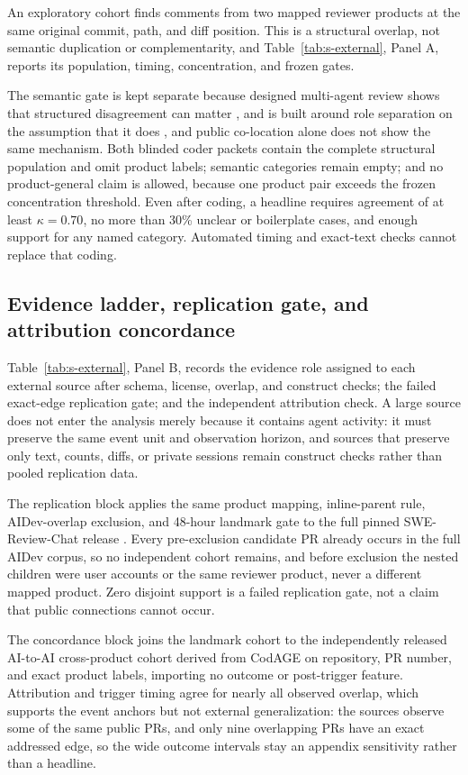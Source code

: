 \documentclass[pdflatex,sn-basic]{sn-jnl}
\begin{document}
An exploratory cohort finds comments from two mapped reviewer products at the
same original commit, path, and diff position. This is a structural overlap, not
semantic duplication or complementarity, and Table~\ref{tab:s-external}, Panel A,
reports its population, timing, concentration, and frozen gates.

The semantic gate is kept separate because designed multi-agent review shows that structured disagreement can matter
\citep{qiu2026adversarial}, and is built around role separation on the
assumption that it does \citep{zhang2026reporeviewer}, and public co-location alone
does not show the same mechanism. Both blinded coder packets contain the
complete structural population and omit product labels; semantic categories
remain empty; and no product-general claim is allowed, because one product pair
exceeds the frozen concentration threshold. Even after coding, a headline
requires agreement of at least $\kappa=0.70$, no more than 30\% unclear or
boilerplate cases, and enough support for any named category. Automated timing
and exact-text checks cannot replace that coding.

\subsection{Evidence ladder, replication gate, and attribution concordance}
\label{app:ladder}

Table~\ref{tab:s-external}, Panel B, records the evidence role assigned to each
external source after schema, license, overlap, and construct checks; the failed
exact-edge replication gate; and the independent attribution check. A large
source does not enter the analysis merely because it contains agent activity: it
must preserve the same event unit and observation horizon, and sources that
preserve only text, counts, diffs, or private sessions remain construct checks
rather than pooled replication data.

The replication block applies the same product mapping, inline-parent rule,
AIDev-overlap exclusion, and 48-hour landmark gate to the full pinned
SWE-Review-Chat release \citep{zhong2026agenticreview}. Every pre-exclusion
candidate PR already occurs in the full AIDev corpus, so no independent cohort
remains, and before exclusion the nested children were user accounts or the same
reviewer product, never a different mapped product. Zero disjoint support is a
failed replication gate, not a claim that public connections cannot occur.

The concordance block joins the landmark cohort to the independently released
AI-to-AI cross-product cohort derived from CodAGE \citep{selvanayagam2026a2a} on
repository, PR number, and exact product labels, importing no outcome or
post-trigger feature. Attribution and trigger timing agree for nearly all
observed overlap, which supports the event anchors but not external
generalization: the sources observe some of the same public PRs, and only nine
overlapping PRs have an exact addressed edge, so the wide outcome intervals stay
an appendix sensitivity rather than a headline.
\end{document}
